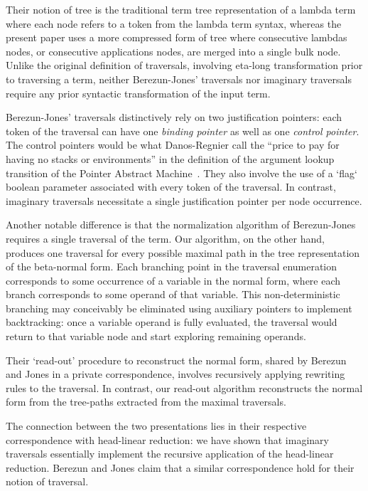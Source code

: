 \documentclass{elsarticle}
\theoremstyle{plain}
\theoremstyle{definition}
\begin{document}
Their notion of tree is the traditional term tree representation of a lambda term where each node refers to a token from the lambda term syntax, whereas the present paper uses a more compressed form of tree where consecutive lambdas nodes, or consecutive applications nodes, are merged into a single bulk node. Unlike the original definition of traversals, involving eta-long transformation prior to traversing a term, neither Berezun-Jones' traversals nor imaginary traversals require any prior syntactic transformation of the input term.

Berezun-Jones' traversals distinctively rely on two justification pointers: each token of the traversal can have one \emph{binding pointer} as well as one \emph{control pointer}. The control pointers would be what Danos-Regnier call the ``price to pay for having no stacks or environments'' in the definition of the argument lookup transition of the Pointer Abstract Machine~\cite{danos-head}. They also involve the use of a `flag` boolean parameter associated with every token of the traversal.
In contrast, imaginary traversals necessitate a single justification pointer per node occurrence.

Another notable difference is that the normalization algorithm of Berezun-Jones requires a single traversal of the term. Our algorithm, on the other hand, produces one traversal for every possible maximal path in the tree representation of the beta-normal form. Each branching point in the traversal enumeration corresponds to some occurrence of a variable in the normal form, where each branch corresponds to some operand of that variable. This non-deterministic branching may conceivably be eliminated using auxiliary pointers to implement backtracking: once a variable operand is fully evaluated, the traversal would return to that variable node and start exploring remaining operands.

Their `read-out' procedure to reconstruct the normal form, shared by Berezun and Jones in a private correspondence, involves recursively applying rewriting rules to the traversal. In contrast, our read-out algorithm reconstructs the normal form from the tree-paths extracted from the maximal traversals.

The connection between the two presentations lies in their respective correspondence with head-linear reduction: we have shown that imaginary traversals essentially implement the recursive application of the head-linear reduction. Berezun and Jones claim that a similar correspondence hold for their notion of traversal.
\end{document}
